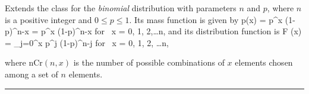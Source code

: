 
Extends the class  for the
\emph{binomial} distribution
\cite[page 321]{sLAW00a} with parameters $n$ and $p$, where
$n$ is a positive integer and $0\le p\le 1$.
Its mass function is given by
\eq
    p(x) =  p^x (1-p)^{n-x} =
       \; p^x (1-p)^{n-x}
       \qquad \mbox{for } x = 0, 1, 2,\ldots n,
          \label{eq:fmass-binomial}
\endeq
and its distribution function is
  \eq
    F (x) = \sum_{j=0}^x \; p^j (1-p)^{n-j}
   \qquad \mbox{for } x = 0, 1, 2, \ldots n,
  \endeq
\begin{htmlonly}
where nCr$(n,x)$ is the number of possible combinations of $x$ elements
chosen among a set of $n$ elements.
\end{htmlonly}

\bigskip\hrule

